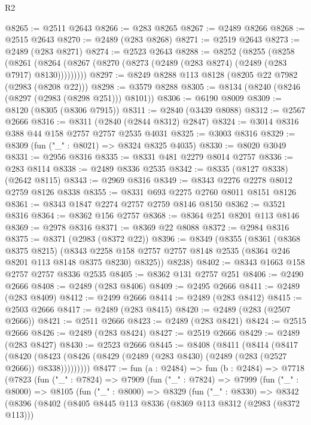 \begin{lexlean}{R2}
\begin{coremodule}
@8265 := @2511 @2643
@8266 := @283 @8265
@8267 := @2489 @8266
@8268 := @2515 @2643
@8270 := @2489 (@283 @8268)
@8271 := @2519 @2643
@8273 := @2489 (@283 @8271)
@8274 := @2523 @2643
@8288 := @8252
    (@8255
      (@8258
        (@8261 (@8264 (@8267 (@8270 (@8273 (@2489 (@283 @8274) (@2489 (@283 @7917) @8130)))))))))
@8297 := @8249 @8288 @113 @8128 (@8205 @22 @7982 (@2983 (@8208 @22)))
@8298 := @3579 @8288
@8305 := @8134 (@8240 (@8246 (@8297 (@2983 (@8298 @251))) @8101))
@8306 := @6190 @8009
@8309 := @8120 (@8305 (@8306 @7915))
@8311 := @2840 (@3439 @8088)
@8312 := @2567 @2666
@8316 := @8311 (@2840 (@2844 @8312) @2847)
@8324 := @3014 @8316 @388 @44 @158 @2757 @2757 @2535 @4031
@8325 := @3003 @8316
@8329 := @8309 (fun ("_" : @8021) => @8324 @8325 @4035)
@8330 := @8020 @3049
@8331 := @2956 @8316
@8335 := @8331 @481 @2279 @8014 @2757
@8336 := @283 @8114
@8338 := @2489 @8336 @2535
@8342 := @8335 (@8127 @8338) (@2642 @8115)
@8343 := @2969 @8316
@8349 := @8343 @2276 @2278 @8012 @2759 @8126 @8338
@8355 := @8331 @693 @2275 @2760 @8011 @8151 @8126
@8361 := @8343 @1847 @2274 @2757 @2759 @8146 @8150
@8362 := @3521 @8316
@8364 := @8362 @156 @2757
@8368 := @8364 @251 @8201 @113 @8146
@8369 := @2978 @8316
@8371 := @8369 @22 @8088
@8372 := @2984 @8316
@8375 := @8371 (@2983 (@8372 @22))
@8396 := @8349
    (@8355
      (@8361
        (@8368 @8375 @8215)
        (@8343 @2258 @158 @2757 @2757 @8148 @2535 (@8364 @246 @8201 @113 @8148 @8375 @8230) @8325))
      @8238)
@8402 := @8343 @1663 @158 @2757 @2757 @8336 @2535
@8405 := @8362 @131 @2757 @251
@8406 := @2490 @2666
@8408 := @2489 (@283 @8406)
@8409 := @2495 @2666
@8411 := @2489 (@283 @8409)
@8412 := @2499 @2666
@8414 := @2489 (@283 @8412)
@8415 := @2503 @2666
@8417 := @2489 (@283 @8415)
@8420 := @2489 (@283 (@2507 @2666))
@8421 := @2511 @2666
@8423 := @2489 (@283 @8421)
@8424 := @2515 @2666
@8426 := @2489 (@283 @8424)
@8427 := @2519 @2666
@8429 := @2489 (@283 @8427)
@8430 := @2523 @2666
@8445 := @8408
    (@8411
      (@8414
        (@8417
          (@8420 (@8423 (@8426 (@8429 (@2489 (@283 @8430) (@2489 (@283 (@2527 @2666)) @8338)))))))))
@8477 := fun (a : @2484) =>
  fun (b : @2484) =>
  @7718
    (@7823
      (fun ("_" : @7824) =>
      @7909
        (fun ("_" : @7824) =>
        @7999
          (fun ("_" : @8000) =>
          @8105
            (fun ("_" : @8000) =>
            @8329
              (fun ("_" : @8330) =>
              @8342
                (@8396
                  (@8402
                    (@8405
                      @8445
                      @113
                      @8336
                      (@8369 @113 @8312 (@2983 (@8372 @113)))

\end{coremodule}
\end{lexlean}
